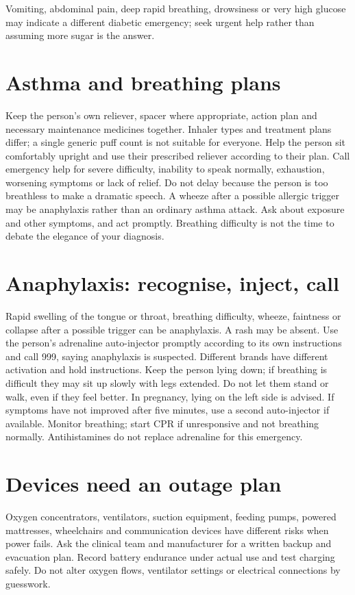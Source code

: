 \documentclass[10pt,openright]{book}
\begin{document}
Vomiting, abdominal pain, deep rapid breathing, drowsiness or very high glucose may indicate a different diabetic emergency; seek urgent help rather than assuming more sugar is the answer.

\section*{Asthma and breathing plans}
Keep the person's own reliever, spacer where appropriate, action plan and necessary maintenance medicines together. Inhaler types and treatment plans differ; a single generic puff count is not suitable for everyone. Help the person sit comfortably upright and use their prescribed reliever according to their plan. Call emergency help for severe difficulty, inability to speak normally, exhaustion, worsening symptoms or lack of relief. Do not delay because the person is too breathless to make a dramatic speech. A wheeze after a possible allergic trigger may be anaphylaxis rather than an ordinary asthma attack. Ask about exposure and other symptoms, and act promptly. Breathing difficulty is not the time to debate the elegance of your diagnosis.

\section*{Anaphylaxis: recognise, inject, call}
Rapid swelling of the tongue or throat, breathing difficulty, wheeze, faintness or collapse after a possible trigger can be anaphylaxis. A rash may be absent. Use the person's adrenaline auto-injector promptly according to its own instructions and call 999, saying anaphylaxis is suspected. Different brands have different activation and hold instructions. Keep the person lying down; if breathing is difficult they may sit up slowly with legs extended. Do not let them stand or walk, even if they feel better. In pregnancy, lying on the left side is advised. If symptoms have not improved after five minutes, use a second auto-injector if available. Monitor breathing; start CPR if unresponsive and not breathing normally. Antihistamines do not replace adrenaline for this emergency.

\section*{Devices need an outage plan}
Oxygen concentrators, ventilators, suction equipment, feeding pumps, powered mattresses, wheelchairs and communication devices have different risks when power fails. Ask the clinical team and manufacturer for a written backup and evacuation plan. Record battery endurance under actual use and test charging safely. Do not alter oxygen flows, ventilator settings or electrical connections by guesswork.
\end{document}

